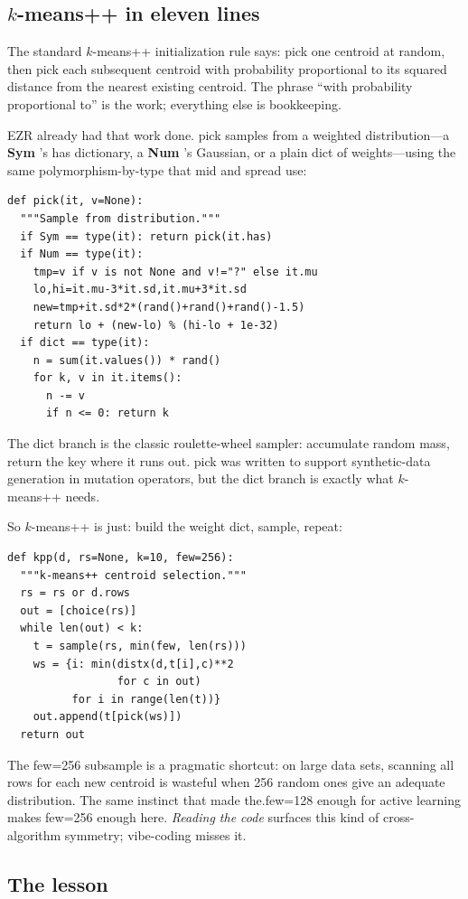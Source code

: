 \documentclass[AMA,STIX2COL]{WileyNJDv5}
\newcommand{\cls}[1]{%
  \setlength{\fboxsep}{1.5pt}%
  \colorbox{clsbg}{\sffamily\bfseries{#1}}%
}
\begin{document}
{\subsection*{$k$-means++ in eleven lines}

The standard $k$-means++ initialization rule says: pick one centroid
at random, then pick each subsequent centroid with probability
proportional to its squared distance from the nearest existing
centroid. The phrase ``with probability proportional to'' is the
work; everything else is bookkeeping.

EZR already had that work done. \textsf{pick} samples from a
weighted distribution---a \cls{Sym}'s \textsf{has} dictionary, a
\cls{Num}'s Gaussian, or a plain dict of weights---using the same
polymorphism-by-type that \textsf{mid} and \textsf{spread} use:
\begin{verbatim}
def pick(it, v=None):
  """Sample from distribution."""
  if Sym == type(it): return pick(it.has)
  if Num == type(it):
    tmp=v if v is not None and v!="?" else it.mu
    lo,hi=it.mu-3*it.sd,it.mu+3*it.sd
    new=tmp+it.sd*2*(rand()+rand()+rand()-1.5)
    return lo + (new-lo) % (hi-lo + 1e-32)
  if dict == type(it):
    n = sum(it.values()) * rand()
    for k, v in it.items():
      n -= v
      if n <= 0: return k
\end{verbatim}
The dict branch is the classic roulette-wheel sampler: accumulate
random mass, return the key where it runs out. \textsf{pick} was
written to support synthetic-data generation in mutation operators,
but the dict branch is exactly what $k$-means++ needs.

So $k$-means++ is just: build the weight dict, sample, repeat:
\begin{verbatim}
def kpp(d, rs=None, k=10, few=256):
  """k-means++ centroid selection."""
  rs = rs or d.rows
  out = [choice(rs)]
  while len(out) < k:
    t = sample(rs, min(few, len(rs)))
    ws = {i: min(distx(d,t[i],c)**2
                 for c in out)
          for i in range(len(t))}
    out.append(t[pick(ws)])
  return out
\end{verbatim}
The \textsf{few=256} subsample is a pragmatic shortcut: on large
data sets, scanning all rows for each new centroid is wasteful when
256 random ones give an adequate distribution. The same instinct
that made \textsf{the.few}=128 enough for active learning makes
\textsf{few}=256 enough here. {\em Reading the code} surfaces this
kind of cross-algorithm symmetry; vibe-coding misses it.

\subsection*{The lesson}

}
\end{document}
